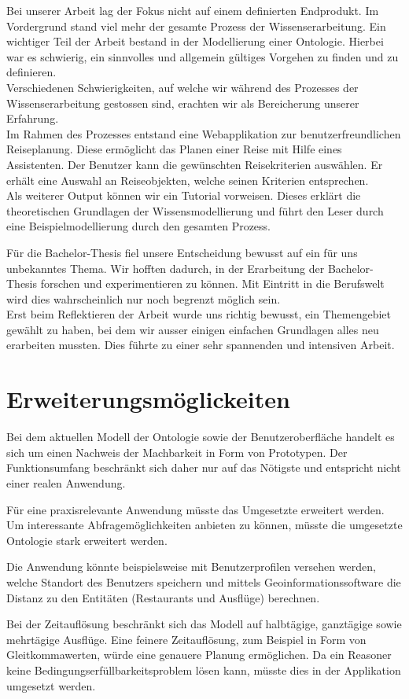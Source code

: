 Bei unserer Arbeit lag der Fokus nicht auf einem definierten Endprodukt. Im Vordergrund stand viel mehr der gesamte Prozess der Wissenserarbeitung. Ein wichtiger Teil der Arbeit bestand in der Modellierung einer Ontologie. Hierbei war es schwierig, ein sinnvolles und allgemein gültiges Vorgehen zu finden und zu definieren.\\
Verschiedenen Schwierigkeiten, auf welche wir während des Prozesses der Wissenserarbeitung gestossen sind, erachten wir als Bereicherung unserer Erfahrung.\\
Im Rahmen des Prozesses entstand eine Webapplikation zur benutzerfreundlichen Reiseplanung. Diese ermöglicht das Planen einer Reise mit Hilfe eines Assistenten. Der Benutzer kann die gewünschten Reisekriterien auswählen. Er erhält eine Auswahl an Reiseobjekten, welche seinen Kriterien entsprechen.\\
Als weiterer Output können wir ein Tutorial vorweisen. Dieses erklärt die theoretischen Grundlagen der Wissensmodellierung und führt den Leser durch eine Beispielmodellierung durch den gesamten Prozess.

Für die Bachelor-Thesis fiel unsere Entscheidung bewusst auf ein für uns unbekanntes Thema. Wir hofften dadurch, in der Erarbeitung der Bachelor-Thesis forschen und experimentieren zu können. Mit Eintritt in die Berufswelt wird dies wahrscheinlich nur noch begrenzt möglich sein.\\
Erst beim Reflektieren der Arbeit wurde uns richtig bewusst, ein Themengebiet gewählt zu haben, bei dem wir ausser einigen einfachen Grundlagen alles neu erarbeiten mussten. Dies führte zu einer sehr spannenden und intensiven Arbeit.


\section{Erweiterungsmöglickeiten}
\label{sec:fazit_subchap}
Bei dem aktuellen Modell der Ontologie sowie der Benutzeroberfläche handelt es sich um einen Nachweis der Machbarkeit in Form von Prototypen. Der Funktionsumfang beschränkt sich daher nur auf das Nötigste und entspricht nicht einer realen Anwendung.

Für eine praxisrelevante Anwendung müsste das Umgesetzte erweitert werden. Um interessante Abfragemöglichkeiten anbieten zu können, müsste die umgesetzte Ontologie stark erweitert werden.

Die Anwendung könnte beispielsweise mit Benutzerprofilen versehen werden, welche Standort des Benutzers speichern und mittels Geoinformationssoftware die Distanz zu den Entitäten (Restaurants und Ausflüge) berechnen.

Bei der Zeitauflösung beschränkt sich das Modell auf halbtägige, ganztägige sowie mehrtägige Ausflüge. Eine feinere Zeitauflösung, zum Beispiel in Form von Gleitkommawerten, würde eine genauere Planung ermöglichen. Da ein Reasoner keine Bedingungserfüllbarkeitsproblem lösen kann, müsste dies in der Applikation umgesetzt werden.
